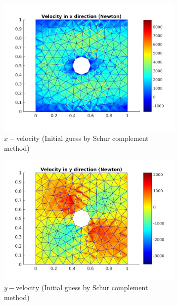 \documentclass[a4paper]{book}
\begin{document}
\begin{figure}
\begin{subfigure}{0.5\textwidth}	
  \includegraphics[width=\linewidth]{cylinder_newton_vx_schur.jpg}
  \caption{$x-$velocity (Initial guess by Schur complement method)}
  \label{x_vel_navier_stoke_schur}
\end{subfigure}
\begin{subfigure}{0.5\textwidth}	
  \includegraphics[width=\linewidth]{cylinder_newton_vy_schur.jpg}
  \caption{$y-$velocity (Initial guess by Schur complement method)}
  \label{y_vel_navier_stoke_schur}
\end{subfigure}
\begin{subfigure}{\textwidth}	

\end{subfigure}
\end{figure}
\end{document}
